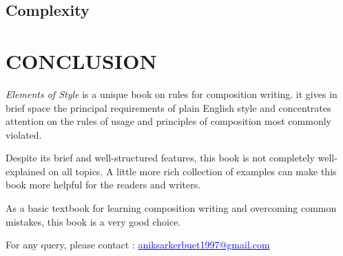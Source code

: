\documentclass{report}
\begin{document}
    \section{Complexity}
    
    \chapter{}
    \chapter{CONCLUSION}{
        \textit{Elements of Style} is a unique book on rules for composition writing. it gives in brief space the principal requirements of plain English style and concentrates attention on the rules of usage and principles of composition most commonly violated.
        
        \bigskip
        
        Despite its brief and well-structured features, this book is not completely well-explained on all topics. A little more rich collection of examples can make this book more helpful for the readers and writers.
        
        \bigskip
        
        As a basic textbook for learning composition writing and overcoming common mistakes, this book is a very good choice.
        
        \bigskip
        
        For any query, please contact : 
        \href{http://aniksarkerbuet1997@gmail.com}{\textcolor{blue}{aniksarkerbuet1997@gmail.com}}
    }
    
    
\end{document}

